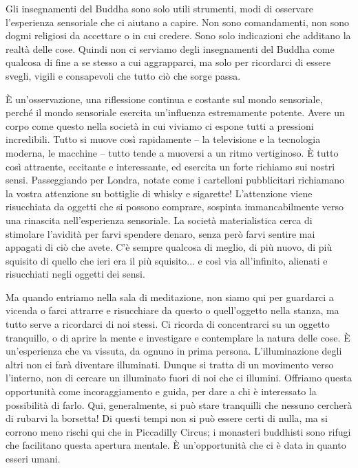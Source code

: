 Gli insegnamenti del Buddha sono solo utili strumenti, modi di osservare
l'esperienza sensoriale che ci aiutano a capire. Non sono comandamenti,
non sono dogmi religiosi da accettare o in cui credere. Sono solo
indicazioni che additano la realtà delle cose. Quindi non ci serviamo
degli insegnamenti del Buddha come qualcosa di fine a se stesso a cui
aggrapparci, ma solo per ricordarci di essere svegli, vigili e
consapevoli che tutto ciò che sorge passa.

È un'osservazione, una riflessione continua e costante sul mondo
sensoriale, perché il mondo sensoriale esercita un'influenza
estremamente potente. Avere un corpo come questo nella società in cui
viviamo ci espone tutti a pressioni incredibili. Tutto si muove così
rapidamente – la televisione e la tecnologia moderna, le macchine –
tutto tende a muoversi a un ritmo vertiginoso. È tutto così attraente,
eccitante e interessante, ed esercita un forte richiamo sui nostri
sensi. Passeggiando per Londra, notate come i cartelloni pubblicitari
richiamano la vostra attenzione su bottiglie di whisky e sigarette!
L'attenzione viene risucchiata da oggetti che si possono comprare,
sospinta immancabilmente verso una rinascita nell'esperienza sensoriale.
La società materialistica cerca di stimolare l'avidità per farvi
spendere denaro, senza però farvi sentire mai appagati di ciò che avete.
C'è sempre qualcosa di meglio, di più nuovo, di più squisito di quello
che ieri era il più squisito... e così via all'infinito, alienati e
risucchiati negli oggetti dei sensi.

Ma quando entriamo nella sala di meditazione, non siamo qui per
guardarci a vicenda o farci attrarre e risucchiare da questo o
quell'oggetto nella stanza, ma tutto serve a ricordarci di noi stessi.
Ci ricorda di concentrarci su un oggetto tranquillo, o di aprire la
mente e investigare e contemplare la natura delle cose. È un'esperienza
che va vissuta, da ognuno in prima persona. L'illuminazione degli altri
non ci farà diventare illuminati. Dunque si tratta di un movimento verso
l'interno, non di cercare un illuminato fuori di noi che ci illumini.
Offriamo questa opportunità come incoraggiamento e guida, per dare a chi
è interessato la possibilità di farlo. Qui, generalmente, si può stare
tranquilli che nessuno cercherà di rubarvi la borsetta! Di questi tempi
non si può essere certi di nulla, ma si corrono meno rischi qui che in
Piccadilly Circus; i monasteri buddhisti sono rifugi che facilitano
questa apertura mentale. È un'opportunità che ci è data in quanto
esseri umani.

